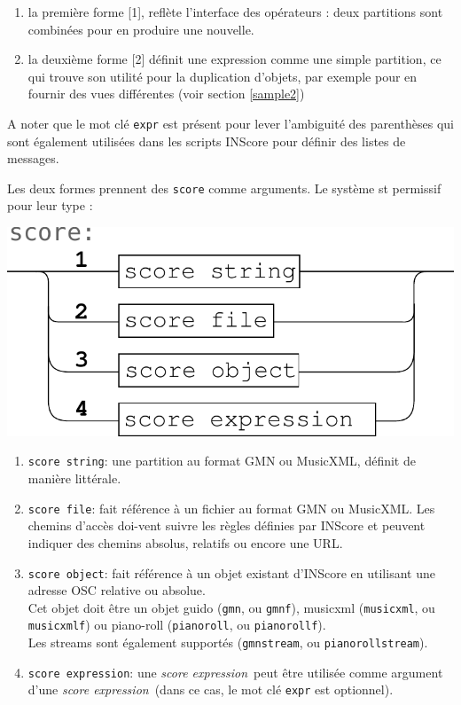 \documentclass{article}
\newcommand{\OSC}[1]{\texttt{#1}}
\newcommand{\sExpr}{\emph{score expression}}
\begin{document}
\begin{enumerate}
\item la première forme [1], reflète l'interface des opérateurs : deux partitions sont combinées pour en produire une nouvelle.
\item la deuxième forme [2] définit une expression comme une simple partition, ce qui trouve son utilité pour la duplication d'objets, par exemple pour en fournir des vues différentes (voir section \ref{sample2})
\end{enumerate}

A noter que le mot clé \OSC{expr} est présent pour lever l'ambiguité des parenthèses qui sont également utilisées dans les scripts INScore pour définir des listes de messages.

Les deux formes prennent des \OSC{score} comme arguments. Le système st permissif pour leur type :
\begin{center}
\includegraphics[width=0.7\columnwidth]{imgs/syntax2}
\end{center}

\begin{enumerate}
\item \OSC{score string}: une partition au format GMN ou MusicXML, définit de manière littérale.
\item \OSC{score file}:  fait référence à un fichier au format GMN ou MusicXML. Les chemins d'accès doi-vent suivre les règles définies par INScore et peuvent indiquer des chemins absolus, relatifs ou encore une URL.
\item \OSC{score object}:  fait référence à un objet existant d'INScore en utilisant une adresse OSC relative ou absolue.\\ Cet objet doit être un objet guido (\OSC{gmn}, ou \OSC{gmnf}), musicxml (\OSC{musicxml}, ou \OSC{musicxmlf}) ou piano-roll (\OSC{pianoroll}, ou \OSC{pianorollf}). \\
Les streams sont également supportés (\OSC{gmnstream}, ou \OSC{pianorollstream}).
\item \OSC{score expression}:  une \sExpr\ peut être utilisée comme argument d'une \sExpr\ (dans ce cas, le mot clé \OSC{expr} est optionnel).
\end{enumerate}
\end{document}
